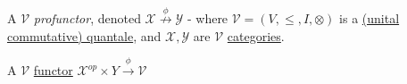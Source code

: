 A $\mathcal{V}$ \emph{profunctor}, denoted $\mathcal{X}\overset{\phi}{\nrightarrow} \mathcal{Y}$
    - where $\mathcal{V}=(V,\leq,I,\otimes)$ is a \href{doc/1 math/Seven Sketches in Compositionality/Chapter 2: Resource theories/5 Computing presented V-categories with matrix mult/2 Quantales/1 Quantale}{(unital commutative) quantale}, and $\mathcal{X},\mathcal{Y}$ are $\mathcal{V}$ \href{doc/1 math/Seven Sketches in Compositionality/Chapter 2: Resource theories/3 Enrichment/1 V-categories/1 V-category}{categories}.

A $\mathcal{V}$ \href{doc/1 math/Seven Sketches in Compositionality/Chapter 2: Resource theories/4 Constructions on V-categories/2 Enriched functors/1 V-functor}{functor} $\mathcal{X}^{op}\times Y \xrightarrow{\phi} \mathcal{V}$
